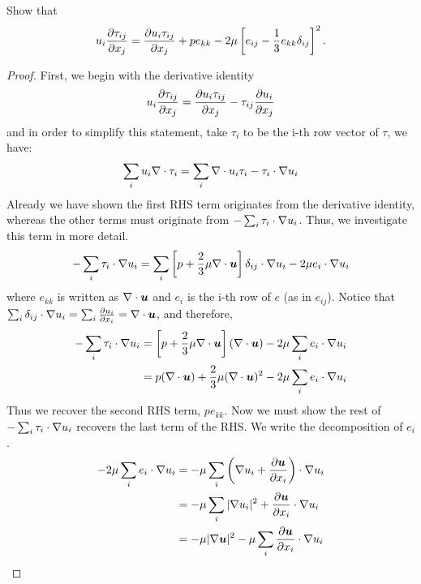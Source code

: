 \documentclass{article}
\begin{document}
Show that 
\begin{gather*}
    u_i\frac{\partial \tau_{ij}}{\partial x_j} = \frac{\partial u_i\tau_{ij}}{\partial x_j} + pe_{kk} -
    2\mu\left[e_{ij} - \frac{1}{3}e_{kk}\delta_{ij}\right]^2. 
\end{gather*}

\begin{proof}
    First, we begin with the derivative identity
    \begin{gather*}
        u_i\frac{\partial \tau_{ij}}{\partial x_j} = \frac{\partial u_i\tau_{ij}}{\partial x_j} - \tau_{ij}\frac{\partial u_i}{\partial x_j}
    \end{gather*}
    and in order to simplify this statement, take $\tau_i$ to be the i-th row
    vector of $\tau$, we have:
    \begin{gather*}
        \sum_i u_i\nabla \cdot{\tau_i} = \sum_i\nabla \cdot{u_i\tau_i} - \tau_i\cdot\nabla u_i
    \end{gather*}
    Already we have shown the first RHS term originates from the derivative
    identity, whereas the other terms must originate from
    $-\sum_i\tau_i\cdot\nabla u_i$. Thus, we investigate this term in more
    detail. 
    \begin{gather*}
        -\sum_i\tau_i\cdot\nabla u_i =\sum_i \left[p +
        \frac{2}{3}\mu\nabla\cdot\boldsymbol{u}\right]\delta_{ij}\cdot\nabla u_i - 2\mu
        e_i\cdot\nabla u_i
    \end{gather*}
    where $e_{kk}$ is written as $\nabla\cdot\boldsymbol{u}$ and $e_i$ is the i-th row of
    $e$ (as in $e_{ij}$). Notice that $\sum_{i}\delta_{ij}\cdot\nabla u_i =
    \sum_i \frac{\partial u_i}{\partial x_i} = 
    \nabla\cdot\boldsymbol{u}$, and therefore, 
    \begin{align*}
         -\sum_i\tau_i\cdot\nabla u_i &= \left[p +
        \frac{2}{3}\mu\nabla\cdot\boldsymbol{u}\right](\nabla\cdot\boldsymbol{u}) - 2\mu
        \sum_ie_i\cdot\nabla u_i\\
        &= p(\nabla \cdot{\boldsymbol{u}}) + \frac{2}{3}\mu(\nabla \cdot{\boldsymbol{u}})^2 - 2\mu
        \sum_ie_i\cdot\nabla u_i
    \end{align*}
    Thus we recover the second RHS term, $pe_{kk}$. Now we must show the rest of
    $-\sum_i\tau_i\cdot\nabla u_i$ recovers the last term of the RHS. We write
    the decomposition of $e_{i}$. 
    \begin{align*}
        -2\mu\sum_ie_i\cdot\grad u_i &= -\mu\sum_i \left(\grad u_i +
        \ppxi{\uvec}\right)\cdot\grad u_i\\
        &= -\mu \sum_i |\grad u_i|^2 + \ppxi{\uvec}\cdot\grad u_i\\
        &= -\mu |\grad\uvec|^2 - \mu\sum_i \ppxi{\uvec}\cdot\grad u_i\\

\end{align*}
\end{proof}
\end{document}
